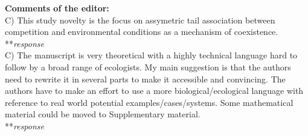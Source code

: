 \documentclass[letterpaper,11pt]{article}
\begin{document}
\noindent \textbf{Comments of the editor:} \\

\noindent C) This study novelty is the focus on assymetric tail association between competition and environmental conditions as a mechanism of coexistence. \\

\noindent ***\emph{response} \\

\noindent C) The manuscript is very theoretical with a highly technical language hard to follow by a broad range of ecologists. My main suggestion is that the authors need to rewrite it in several parts to make it accessible and convincing. The authors have to make an effort to use a more biological/ecological language with reference to real world potential examples/cases/systems. Some mathematical material could be moved to Supplementary material. \\

\noindent ***\emph{response} \\
\end{document}
